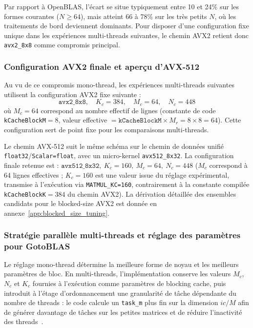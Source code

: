 \documentclass[a4paper,11pt,oneside]{article}
\begin{document}
Par rapport à OpenBLAS, l'écart se situe typiquement entre 10 et 24\% sur les formes courantes ($N \geq 64$), mais atteint 66 à 78\% sur les très petits $N$, où les traitements de bord deviennent dominants. Pour disposer d'une configuration fixe unique dans les expériences multi-threads suivantes, le chemin AVX2 retient donc \texttt{avx2\_8x8} comme compromis principal.

\subsubsection{Configuration AVX2 finale et aperçu d'AVX-512}\label{sec:avx512_brief}

Au vu de ce compromis mono-thread, les expériences multi-threads suivantes utilisent la configuration AVX2 fixe suivante :
\[
\texttt{avx2\_8x8},\quad K_c = 384,\quad M_c = 64,\quad N_c = 448
\]
où $M_c=64$ correspond au nombre effectif de lignes (constante de code \texttt{kCacheBlockM}$=8$, valeur effective $= \texttt{kCacheBlockM} \times M_r = 8 \times 8 = 64$).
Cette configuration sert de point fixe pour les comparaisons multi-threads.

Le chemin AVX-512 suit le même schéma sur le chemin de données unifié \texttt{float32}/\texttt{Scalar=float}, avec un micro-kernel \texttt{avx512\_8x32}. La configuration finale retenue est : $\texttt{avx512\_8x32},\ K_c=160,\ M_c=64,\ N_c=448$ ($M_c$ correspond à 64 lignes effectives ; $K_c=160$ est une valeur issue du réglage expérimental, transmise à l'exécution via \texttt{MATMUL\_KC=160}, contrairement à la constante compilée \texttt{kCacheBlockK}$=384$ du chemin AVX2).
La dérivation détaillée des ensembles candidats pour le blocked-size AVX2 est donnée en annexe~\ref{app:blocked_size_tuning}.

\subsubsection{Stratégie parallèle multi-threads et réglage des paramètres pour GotoBLAS}\label{sec:gotoblas_mt}

Le réglage mono-thread détermine la meilleure forme de noyau et les meilleurs paramètres de bloc. En multi-threads, l'implémentation conserve les valeurs $M_c$, $N_c$ et $K_c$ fournies à l'exécution comme paramètres de blocking cache, puis introduit à l'étage d'ordonnancement une granularité de tâche dépendante du nombre de threads : le code calcule un \texttt{task\_m} plus fin sur la dimension $ic/M$ afin de générer davantage de tâches sur les petites matrices et de réduire l'inactivité des threads~\cite{smith2014anatomy}.
\end{document}
